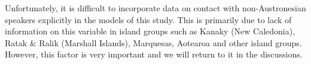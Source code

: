 \documentclass[unnumsec,webpdf,modern,medium]{oup-authoring-template}
\begin{document}
Unfortunately, it is difficult to incorporate data on contact with non-Austronesian speakers explicitly in the models of this study. This is primarily due to lack of information on this variable in island groups such as Kanaky (New Caledonia), Ratak \& Ralik (Marshall Islands), Marquesas, Aotearoa and other island groups. However, this factor is very important and we will return to it in the discussions.




\end{document}
